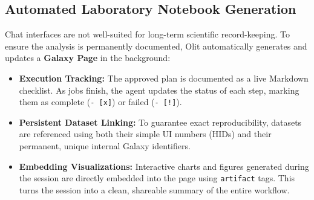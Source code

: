 \subsection{Automated Laboratory Notebook Generation}
Chat interfaces are not well-suited for long-term scientific record-keeping. To ensure the analysis is permanently documented, Olit automatically generates and updates a \textbf{Galaxy Page} in the background:
\begin{itemize}
    \item \textbf{Execution Tracking:} The approved plan is documented as a live Markdown checklist. As jobs finish, the agent updates the status of each step, marking them as complete (\texttt{- [x]}) or failed (\texttt{- [!]}).
    \item \textbf{Persistent Dataset Linking:} To guarantee exact reproducibility, datasets are referenced using both their simple UI numbers (HIDs) and their permanent, unique internal Galaxy identifiers.
    \item \textbf{Embedding Visualizations:} Interactive charts and figures generated during the session are directly embedded into the page using \texttt{{{artifact}}} tags. This turns the session into a clean, shareable summary of the entire workflow.
\end{itemize}

